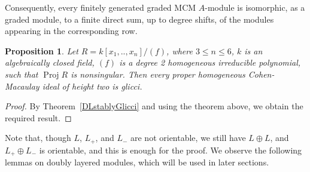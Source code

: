 \documentclass[11pt,letterpaper]{amsart}
\DeclareMathOperator{\Proj}{Proj}
\theoremstyle{plain}
\newtheorem{prop}[thm]{Proposition}
\theoremstyle{definition}
\theoremstyle{remark}
\begin{document}
Consequently, every finitely generated graded MCM \(A\)-module is isomorphic, as a graded module, to a finite direct sum, up to degree shifts, of the modules appearing in the corresponding row. 

\begin{prop}\label{Quadratic hypersurfacesingularities}
    Let $R=k[x_1,..,x_n]/(f)$, where $3\le n\le 6$, $k$ is an algebraically closed field, $(f)$ is a degree 2 homogeneous irreducible polynomial, such that $\Proj R$ is nonsingular. Then every proper homogeneous Cohen-Macaulay ideal of height two is glicci. 
\end{prop}
\begin{proof}
    By Theorem~\ref{DLstablyGlicci} and using the theorem above, we obtain the required result.
\end{proof}

Note that, though $L$, $L_+$, and $L_-$ are not orientable, we still have $L\oplus L$, and $L_+\oplus L_-$ is orientable, and this is enough for the proof. %
 We observe the following lemmas on doubly layered modules, which will be used in later sections.
\end{document}
